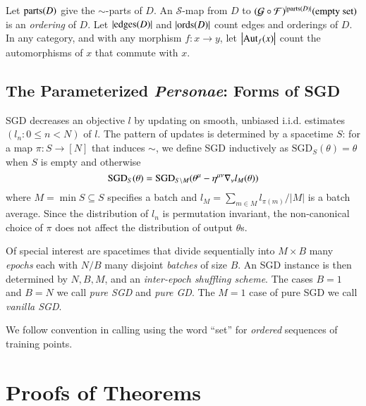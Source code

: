 \documentclass{article}
\newcommand{\Free}{\mathcal{F}}
\newcommand{\Forg}{\mathcal{G}}
\newcommand{\Aut}{\text{\textnormal{Aut}}}
\newcommand{\edges}{\text{\textnormal{edges}}}
\newcommand{\ords}{\text{\textnormal{ords}}}
\newcommand{\parts}{\text{\textnormal{parts}}}
\newcommand{\Ss}{\mathcal{S}}
\newcommand{\SGD}{\text{\textnormal{SGD}}}
\newcommand{\wabs}[1]{\left|#1\right|}
\begin{document}
        Let $\parts(D)$ give the $\sim$-parts of $D$.  An $\Ss$-map from $D$ to
        $
            (\Forg\circ\Free)^{|\parts(D)|}(\text{empty set})
        $
        is an \emph{ordering} of $D$.  Let $|\edges(D)|$ and $|\ords(D)|$ count
        edges and orderings of $D$.  In any category, and with any morphism
        $f: x\to y$, let $\wabs{\Aut_f(x)}$ count the automorphisms of $x$
        that commute with $x$.
    
    \subsection{The Parameterized \emph{Personae}: Forms of SGD}
        SGD decreases an objective $l$ by updating on smooth, unbiased i.i.d.
        estimates $(l_n: 0\leq n<N)$ of $l$.  The pattern of updates is
        determined by a spacetime $S$: for a map
        $\pi:S\to [N]$ that induces $\sim$, we define SGD inductively as
        $\text{SGD}_{S}(\theta) = \theta$ when $S$ is empty and otherwise
        $$
            \SGD_S(\theta)
            =
            \SGD_{S\setminus M}(
                \theta^\mu - \eta^{\mu\nu} \nabla_\nu l_{M}(\theta)
            )
        $$
        where $M = \min S \subseteq S$ specifies a batch and $l_M = \sum_{m\in
        M} l_{\pi(m)} / \wabs{M}$ is a batch average.  Since the distribution
        of $l_n$ is permutation invariant, the non-canonical choice of $\pi$
        does not affect the distribution of output $\theta$s.
    
        Of special interest are spacetimes that divide sequentially into
        $M\times B$ many \emph{epochs} each with $N/B$ many disjoint
        \emph{batches} of size $B$.  An SGD instance is then determined by $N,
        B, M$, and an \emph{inter-epoch shuffling scheme}.  The cases $B=1$ and
        $B=N$ we call \emph{pure SGD} and \emph{pure GD}.  The $M=1$ case of
        pure SGD we call \emph{vanilla SGD}.

        We follow convention in calling using the word ``set'' for
        \emph{ordered} sequences of training points. 

\section{Proofs of Theorems} \label{sect:proofs}
   
\end{document}
